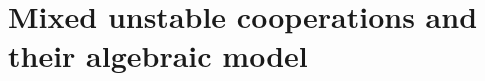 







\section{Mixed unstable cooperations and their algebraic model}\label{UnstableAlgebraicModelSection}

